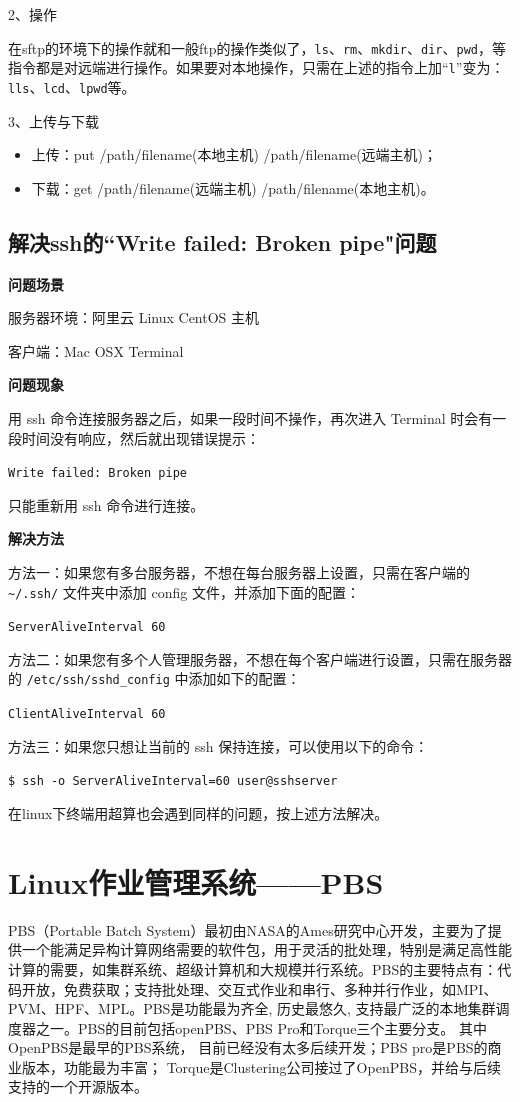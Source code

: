 {2、操作

在sftp的环境下的操作就和一般ftp的操作类似了，\verb|ls|、\verb|rm|、\verb|mkdir|、\verb|dir|、\verb|pwd|，等指令都是对远端进行操作。如果要对本地操作，只需在上述的指令上加“\verb|l|”变为：\verb|lls|、\verb|lcd|、\verb|lpwd|等。

3、上传与下载

\begin{itemize}
\item 上传：put /path/filename(本地主机) /path/filename(远端主机)；
\item 下载：get /path/filename(远端主机) /path/filename(本地主机)。
\end{itemize}



\subsection{解决ssh的``Write failed: Broken pipe"问题}

\textbf{问题场景}

服务器环境：阿里云 Linux CentOS 主机

客户端：Mac OSX Terminal

\textbf{问题现象}

用 ssh 命令连接服务器之后，如果一段时间不操作，再次进入 Terminal 时会有一段时间没有响应，然后就出现错误提示：

\verb|Write failed: Broken pipe|

只能重新用 ssh 命令进行连接。

\textbf{解决方法}

方法一：如果您有多台服务器，不想在每台服务器上设置，只需在客户端的 \verb*|~/.ssh/| 文件夹中添加 config 文件，并添加下面的配置：

\verb*|ServerAliveInterval 60|

方法二：如果您有多个人管理服务器，不想在每个客户端进行设置，只需在服务器的 \verb*|/etc/ssh/sshd_config| 中添加如下的配置：

\verb*|ClientAliveInterval 60|

方法三：如果您只想让当前的 ssh 保持连接，可以使用以下的命令：

\verb*|$ ssh -o ServerAliveInterval=60 user@sshserver|


在linux下终端用超算也会遇到同样的问题，按上述方法解决。



\section{Linux作业管理系统——PBS}
PBS（Portable Batch System）最初由NASA的Ames研究中心开发，主要为了提供一个能满足异构计算网络需要的软件包，用于灵活的批处理，特别是满足高性能计算的需要，如集群系统、超级计算机和大规模并行系统。PBS的主要特点有：代码开放，免费获取；支持批处理、交互式作业和串行、多种并行作业，如MPI、PVM、HPF、MPL。PBS是功能最为齐全, 历史最悠久, 支持最广泛的本地集群调度器之一。PBS的目前包括openPBS、PBS Pro和Torque三个主要分支。 其中OpenPBS是最早的PBS系统， 目前已经没有太多后续开发；PBS pro是PBS的商业版本，功能最为丰富； Torque是Clustering公司接过了OpenPBS，并给与后续支持的一个开源版本。


}
